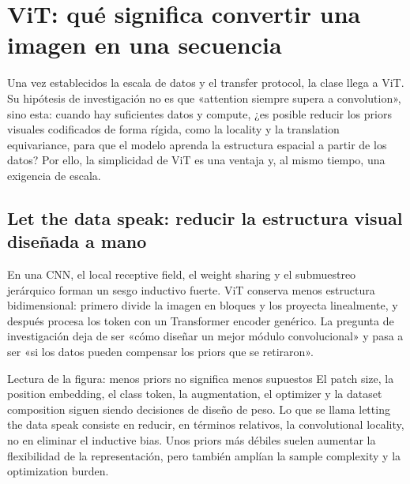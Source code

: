 \section{ViT: qué significa convertir una imagen en una secuencia}

Una vez establecidos la escala de datos y el transfer protocol, la clase llega a ViT. Su hipótesis de investigación no es que «attention siempre supera a convolution», sino esta: cuando hay suficientes datos y compute, ¿es posible reducir los priors visuales codificados de forma rígida, como la locality y la translation equivariance, para que el modelo aprenda la estructura espacial a partir de los datos? Por ello, la simplicidad de ViT es una ventaja y, al mismo tiempo, una exigencia de escala.

\subsection{Let the data speak: reducir la estructura visual diseñada a mano}

En una CNN, el local receptive field, el weight sharing y el submuestreo jerárquico forman un sesgo inductivo fuerte. ViT conserva menos estructura bidimensional: primero divide la imagen en bloques y los proyecta linealmente, y después procesa los token con un Transformer encoder genérico. La pregunta de investigación deja de ser «cómo diseñar un mejor módulo convolucional» y pasa a ser «si los datos pueden compensar los priors que se retiraron».


\begin{knowledgebox}{Lectura de la figura: menos priors no significa menos supuestos}
El patch size, la position embedding, el class token, la augmentation, el optimizer y la dataset composition siguen siendo decisiones de diseño de peso. Lo que se llama letting the data speak consiste en reducir, en términos relativos, la convolutional locality, no en eliminar el inductive bias. Unos priors más débiles suelen aumentar la flexibilidad de la representación, pero también amplían la sample complexity y la optimization burden.
\end{knowledgebox}


